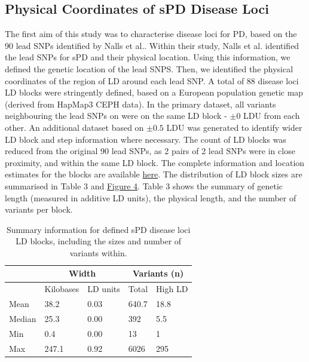 \documentclass{article}
\begin{document}
\subsection{Physical Coordinates of sPD Disease Loci}
\label{subsec:blocks}
The first aim of this study was to characterise disease loci for PD, based on the 90 lead SNPs identified by Nalls et al.\cite{Nalls2019IdentificationStudies}. Within their study, Nalls et al. identified the lead SNPs for sPD and their physical location. Using this information, we defined the genetic location of the lead SNPS. Then, we identified the physical coordinates of the region of LD around each lead SNP. A total of 88 disease loci LD blocks were stringently defined, based on a European population genetic map (derived from HapMap3 CEPH data)\cite{Maniatis2004PositionalDisequilibrium.}. In the primary dataset, all variants neighbouring the lead SNPs on were on the same LD block - $\pm 0$ LDU from each other. An additional dataset based on $\pm 0.5$ LDU was generated to identify wider LD block and step information where necessary. The count of LD blocks was reduced from the original 90 lead SNPs, as 2 pairs of 2 lead SNPs were in close proximity, and within the same LD block. The complete information and location estimates for the blocks are available \href{https://github.com/Thomas-brightwell/PD-MSc-project-code/blob/main/Thesis/Supplementary%20materials/Supplementary%20Results%20table%20.csv}{here}. The distribution of LD block sizes are summarised in Table 3 and \hyperref[fig:blockscatter]{Figure 4}. Table 3 shows the summary of genetic length (measured in additive LD units), the physical length, and the number of variants per block.
\begin{table}[!h]
\centering
\caption{Summary information for defined sPD disease loci LD blocks, including the sizes and number of variants within.}
\label{tab:sPDblocks}
\begin{tabular}{|l|ll|ll|}
\hline
       & \multicolumn{2}{c|}{Width}                & \multicolumn{2}{c|}{Variants (n)}    \\ \hline
       & \multicolumn{1}{l|}{Kilobases} & LD units & \multicolumn{1}{l|}{Total} & High LD \\ \hline
Mean   & \multicolumn{1}{l|}{38.2}      & 0.03     & \multicolumn{1}{l|}{640.7} & 18.8    \\ \hline
Median & \multicolumn{1}{l|}{25.3}      & 0.00     & \multicolumn{1}{l|}{392}   & 5.5     \\ \hline
Min    & \multicolumn{1}{l|}{0.4}       & 0.00     & \multicolumn{1}{l|}{13}    & 1       \\ \hline
Max    & \multicolumn{1}{l|}{247.1}     & 0.92     & \multicolumn{1}{l|}{6026}  & 295     \\ \hline
\end{tabular}
\end{table}
\end{document}

